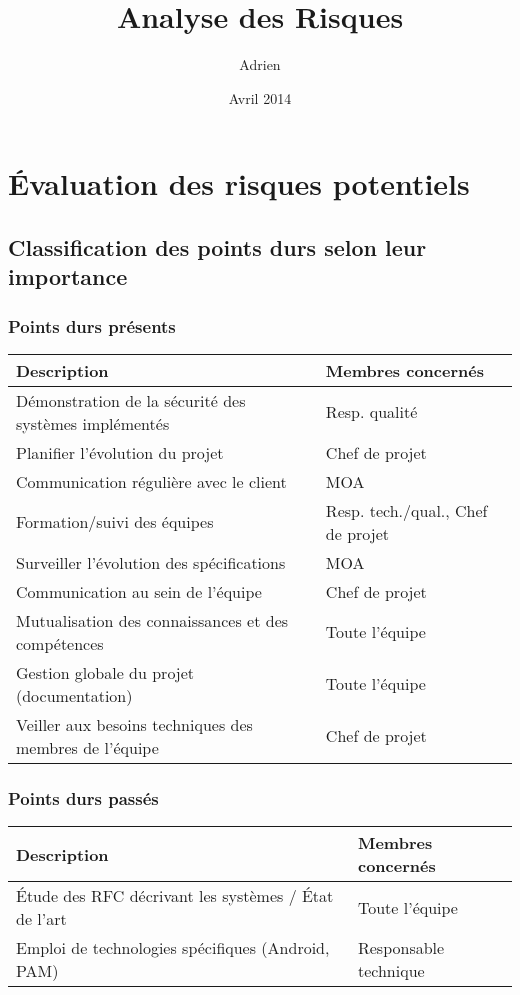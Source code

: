 \documentclass{../../res/univ-projet}
\title{Analyse des Risques}
\author{Adrien \bsc{Smondack}}
\date{Avril 2014}
\begin{document}
\maketitle

\section{Évaluation des risques potentiels}
\subsection{Classification des points durs selon leur importance}
\subsubsection{Points durs présents}
	\begin{tabular}{| p{9cm} | p{5cm} |} 
		\hline
		\cellcolor{gray} Description & \cellcolor{gray} Membres concernés \\ \hline
		Démonstration de la sécurité des systèmes implémentés & Resp. qualité \\ \hline
		Planifier l'évolution du projet & Chef de projet \\ \hline
		Communication régulière avec le client & MOA \\ \hline
		Formation/suivi des équipes & Resp. tech./qual., Chef de projet \\ \hline
		Surveiller l'évolution des spécifications & MOA \\ \hline
		Communication au sein de l'équipe & Chef de projet \\ \hline
		Mutualisation des connaissances et des compétences & Toute l'équipe \\ \hline
		Gestion globale du projet (documentation) & Toute l'équipe\\ \hline
		Veiller aux besoins techniques des membres de l'équipe & Chef de projet \\ \hline
	\end{tabular}

\subsubsection{Points durs passés}
	\begin{tabular}{| p{9cm} | p{5cm} |} 
		\hline
		\cellcolor{gray} Description & \cellcolor{gray} Membres concernés \\ \hline
		Étude des RFC décrivant les systèmes / \'Etat de l'art & Toute l'équipe \\ \hline
		Emploi de technologies spécifiques (Android, PAM) & Responsable technique \\ \hline
	\end{tabular}
	
\end{document}
